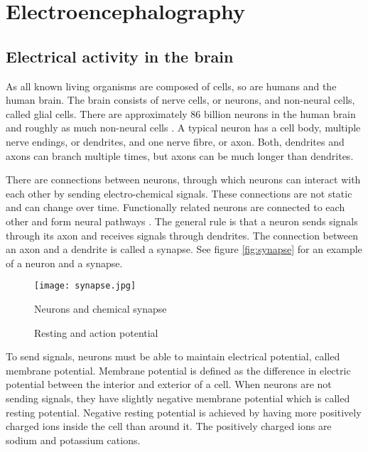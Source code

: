 
\chapter{Electroencephalography}
\section{Electrical activity in the brain}
\label{sec:neuron}

As all known living organisms are composed of cells, so are humans and the human brain. The brain consists of nerve cells, or neurons, and non-neural cells, called glial cells. There are approximately 86 billion neurons in the human brain and roughly as much non-neural cells \cite{neuroncount}. A typical neuron has a cell body, multiple nerve endings, or dendrites, and one nerve fibre, or axon. Both, dendrites and axons can branch multiple times, but axons can be much longer than dendrites. 

There are connections between neurons, through which neurons can interact with each other by sending electro-chemical signals. These connections are not static and can change over time. Functionally related neurons are connected to each other and form neural pathways \cite{neuralpathway}. The general rule is that a neuron sends signals through its axon and receives signals through dendrites. The connection between an axon and a dendrite is called a synapse. See figure \ref{fig:synapse} for an example of a neuron and a synapse.

\begin{figure}[b!]
	\begin{minipage}{0.5\textwidth}
		\centering
		\texttt{[image: synapse.jpg]}
		\caption{Neurons and chemical synapse\cite[p.~17]{neuronpic}}
		\label{fig:synapse}
	\end{minipage}
	\begin{minipage}{0.5\textwidth}
		\centering
		\caption{Resting and action potential}
		\label{fig:action_potential}
	\end{minipage}
\end{figure}

To send signals, neurons must be able to maintain electrical potential, called membrane potential. Membrane potential is defined as the difference in electric potential between the interior and exterior of a cell. When neurons are not sending signals, they have slightly negative membrane potential which is called resting potential. Negative resting potential is achieved by having more positively charged ions inside the cell than around it. The positively charged ions are sodium and potassium cations.

